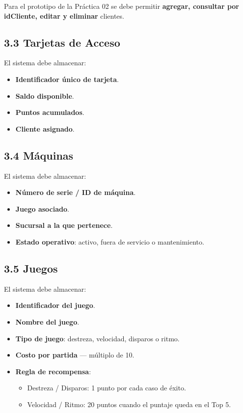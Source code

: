 \documentclass[12pt,a4paper]{article}
\begin{document}
Para el prototipo de la Práctica 02 se debe permitir \textbf{agregar, consultar por idCliente, editar y eliminar} clientes.

\subsection*{3.3 Tarjetas de Acceso}

El sistema debe almacenar:

\begin{itemize}
    \item \textbf{Identificador único de tarjeta}.
    \item \textbf{Saldo disponible}.
    \item \textbf{Puntos acumulados}.
    \item \textbf{Cliente asignado}.
\end{itemize}

\subsection*{3.4 Máquinas}

El sistema debe almacenar:

\begin{itemize}
    \item \textbf{Número de serie / ID de máquina}.
    \item \textbf{Juego asociado}.
    \item \textbf{Sucursal a la que pertenece}.
    \item \textbf{Estado operativo}: activo, fuera de servicio o mantenimiento.
\end{itemize}

\subsection*{3.5 Juegos}

El sistema debe almacenar:

\begin{itemize}
    \item \textbf{Identificador del juego}.
    \item \textbf{Nombre del juego}.
    \item \textbf{Tipo de juego}: destreza, velocidad, disparos o ritmo.
    \item \textbf{Costo por partida} --- múltiplo de 10.
    \item \textbf{Regla de recompensa}:
    \begin{itemize}
        \item Destreza / Disparos: 1 punto por cada caso de éxito.
        \item Velocidad / Ritmo: 20 puntos cuando el puntaje queda en el Top 5.
    \end{itemize}
\end{itemize}
\end{document}
